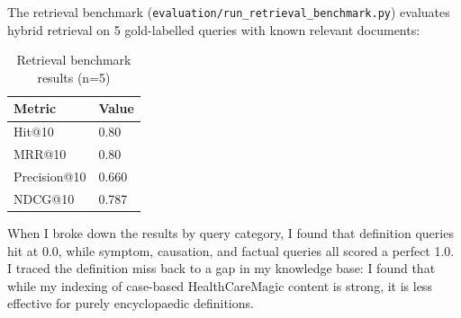 The retrieval benchmark (\texttt{evaluation/run\_retrieval\_benchmark.py}) evaluates hybrid retrieval on 5 gold-labelled queries with known relevant documents:

\begin{table}[htbp]
\centering
\caption{Retrieval benchmark results (n=5)}
\renewcommand{\arraystretch}{1.3}
\begin{tabular}{|l|l|}
\hline
\textbf{Metric} & \textbf{Value} \\
\hline
Hit@10 & 0.80 \\
MRR@10 & 0.80 \\
Precision@10 & 0.660 \\
NDCG@10 & 0.787 \\
\hline
\end{tabular}
\end{table}

When I broke down the results by query category, I found that definition queries hit at 0.0, while symptom, causation, and factual queries all scored a perfect 1.0. I traced the definition miss back to a gap in my knowledge base: I found that while my indexing of case-based HealthCareMagic content is strong, it is less effective for purely encyclopaedic definitions.
